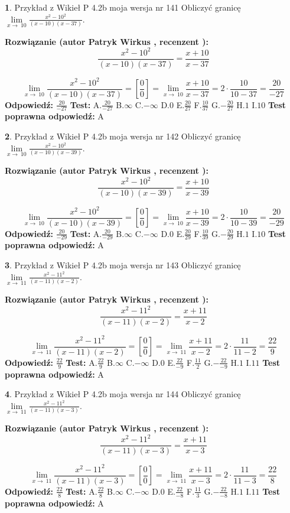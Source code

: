 \documentclass[12pt, a4paper]{article}
\theoremstyle{definition} %
\newtheorem{zad}{}
\newcommand{\zadStart}[1]{\begin{zad}#1\newline}
\newcommand{\zadStop}{\end{zad}}
\newcommand{\rozwStart}[2]{\noindent \textbf{Rozwiązanie (autor #1 , recenzent #2): }\newline}
\newcommand{\rozwStop}{\newline}
\newcommand{\odpStart}{\noindent \textbf{Odpowiedź:}\newline}
\newcommand{\odpStop}{\newline}
\newcommand{\testStart}{\noindent \textbf{Test:}\newline}
\newcommand{\testStop}{\newline}
\newcommand{\kluczStart}{\noindent \textbf{Test poprawna odpowiedź:}\newline}
\newcommand{\kluczStop}{\newline}
\begin{document}
\zadStart{Przykład z Wikieł P 4.2b moja wersja nr 141}
Obliczyć granicę $\lim\limits_{x\to\ 10}\frac{x^{2}-10^{2}}{(x-10)(x-37)}$.
\zadStop
\rozwStart{Patryk Wirkus}{}
$$\frac{x^{2}-10^{2}}{(x-10)(x-37)}=\frac{x+10}{x-37}$$

$$\lim\limits_{x\to\ 10}\frac{x^{2}-10^{2}}{(x-10)(x-37)}=[\frac{0}{0}]=\lim\limits_{x\to\ 10}\frac{x+10}{x-37}=2 \cdot \frac{10}{10-37} = \frac{20}{-27}$$
\rozwStop
\odpStart
$\frac{20}{-27}$
\odpStop
\testStart
A.$\frac{20}{-27}$
B.$\infty$
C.$-\infty$
D.$0$
E.$\frac{20}{27}$
F.$\frac{10}{37}$
G.$-\frac{20}{27}$
H.$1$
I.$10$
\testStop
\kluczStart
A
\kluczStop



\zadStart{Przykład z Wikieł P 4.2b moja wersja nr 142}
Obliczyć granicę $\lim\limits_{x\to\ 10}\frac{x^{2}-10^{2}}{(x-10)(x-39)}$.
\zadStop
\rozwStart{Patryk Wirkus}{}
$$\frac{x^{2}-10^{2}}{(x-10)(x-39)}=\frac{x+10}{x-39}$$

$$\lim\limits_{x\to\ 10}\frac{x^{2}-10^{2}}{(x-10)(x-39)}=[\frac{0}{0}]=\lim\limits_{x\to\ 10}\frac{x+10}{x-39}=2 \cdot \frac{10}{10-39} = \frac{20}{-29}$$
\rozwStop
\odpStart
$\frac{20}{-29}$
\odpStop
\testStart
A.$\frac{20}{-29}$
B.$\infty$
C.$-\infty$
D.$0$
E.$\frac{20}{29}$
F.$\frac{10}{39}$
G.$-\frac{20}{29}$
H.$1$
I.$10$
\testStop
\kluczStart
A
\kluczStop



\zadStart{Przykład z Wikieł P 4.2b moja wersja nr 143}
Obliczyć granicę $\lim\limits_{x\to\ 11}\frac{x^{2}-11^{2}}{(x-11)(x-2)}$.
\zadStop
\rozwStart{Patryk Wirkus}{}
$$\frac{x^{2}-11^{2}}{(x-11)(x-2)}=\frac{x+11}{x-2}$$

$$\lim\limits_{x\to\ 11}\frac{x^{2}-11^{2}}{(x-11)(x-2)}=[\frac{0}{0}]=\lim\limits_{x\to\ 11}\frac{x+11}{x-2}=2 \cdot \frac{11}{11-2} = \frac{22}{9}$$
\rozwStop
\odpStart
$\frac{22}{9}$
\odpStop
\testStart
A.$\frac{22}{9}$
B.$\infty$
C.$-\infty$
D.$0$
E.$\frac{22}{-9}$
F.$\frac{11}{2}$
G.$-\frac{22}{-9}$
H.$1$
I.$11$
\testStop
\kluczStart
A
\kluczStop



\zadStart{Przykład z Wikieł P 4.2b moja wersja nr 144}
Obliczyć granicę $\lim\limits_{x\to\ 11}\frac{x^{2}-11^{2}}{(x-11)(x-3)}$.
\zadStop
\rozwStart{Patryk Wirkus}{}
$$\frac{x^{2}-11^{2}}{(x-11)(x-3)}=\frac{x+11}{x-3}$$

$$\lim\limits_{x\to\ 11}\frac{x^{2}-11^{2}}{(x-11)(x-3)}=[\frac{0}{0}]=\lim\limits_{x\to\ 11}\frac{x+11}{x-3}=2 \cdot \frac{11}{11-3} = \frac{22}{8}$$
\rozwStop
\odpStart
$\frac{22}{8}$
\odpStop
\testStart
A.$\frac{22}{8}$
B.$\infty$
C.$-\infty$
D.$0$
E.$\frac{22}{-8}$
F.$\frac{11}{3}$
G.$-\frac{22}{-8}$
H.$1$
I.$11$
\testStop
\kluczStart
A
\kluczStop
\end{document}
